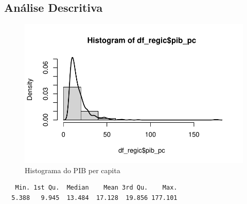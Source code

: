 \documentclass[a4paper,12pt]{article}
\newenvironment{Shaded}{}{}
\newcommand{\AttributeTok}[1]{\textcolor[rgb]{0.65,0.15,0.64}{#1}}
\newcommand{\ConstantTok}[1]{\textcolor[rgb]{0.60,0.41,0.00}{#1}}
\newcommand{\DecValTok}[1]{\textcolor[rgb]{0.60,0.41,0.00}{#1}}
\newcommand{\DocumentationTok}[1]{\textcolor[rgb]{0.89,0.34,0.29}{#1}}
\newcommand{\FunctionTok}[1]{\textcolor[rgb]{0.25,0.47,0.95}{#1}}
\newcommand{\NormalTok}[1]{\textcolor[rgb]{0.22,0.23,0.26}{#1}}
\newcommand{\SpecialCharTok}[1]{\textcolor[rgb]{0.00,0.52,0.74}{#1}}
\begin{document}
\hypertarget{anuxe1lise-descritiva}{%
\subsection{Análise Descritiva}\label{anuxe1lise-descritiva}}

\begin{Shaded}
\end{Shaded}

\begin{figure}[H]

\caption{Histograma do PIB per capita}

{\centering \includegraphics{main_files/figure-pdf/unnamed-chunk-3-1.pdf}

}

\end{figure}

\begin{Shaded}
\end{Shaded}

\begin{verbatim}
   Min. 1st Qu.  Median    Mean 3rd Qu.    Max. 
  5.388   9.945  13.484  17.128  19.856 177.101 
\end{verbatim}
\end{document}
